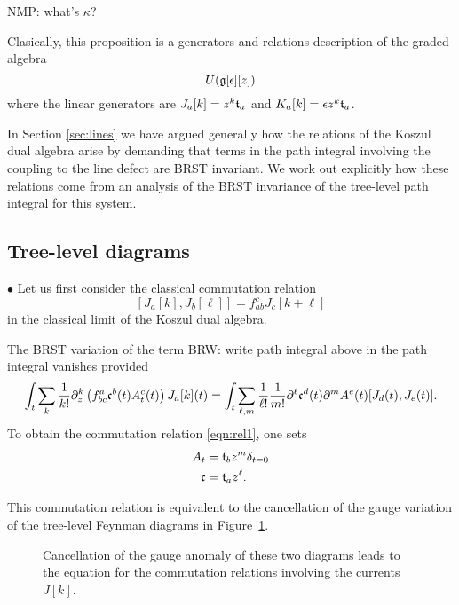\documentclass[11pt]{amsart}
\def\brian#1{{\textcolor{blue!65!red}{BRW: {#1}}}}
\def\natalie#1{{\textcolor{green!65!black}{NMP: {#1}}}}
\begin{document}
\natalie{what's $\kappa$?}

Clasically, this proposition is a generators and relations description of the graded algebra 
\[
U(\mathfrak g[\epsilon][z])
\]
where the linear generators are $J_a[k] = z^k \mathfrak t_a$ and $K_a [k] = \epsilon z^k \mathfrak t_a$. 


In Section \ref{sec:lines} we have argued generally how the relations of the Koszul dual algebra arise by demanding that terms in the path integral involving the coupling to the line defect are BRST invariant. 
We work out explicitly how these relations come from an analysis of the BRST invariance of the tree-level path integral for this system.

\subsection*{Tree-level diagrams}

$\bullet$
Let us first consider the classical commutation relation 
\begin{equation}\label{eqn:rel1}
[J_a [k] , J_b [\ell]] = f_{ab}^c J_{c} [k+\ell] 
\end{equation}
in the classical limit of the Koszul dual algebra. 

The BRST variation of the term \brian{write path integral above} in the path integral vanishes provided
\[
\int_t \sum_k \frac1{k!} \partial_z^k \left(f_{bc}^a \mathfrak c^b(t) A^c_t (t) \right) J_a[k] (t) = \int_t \sum_{\ell,m} \frac1{\ell!} \frac1{m!} \partial^\ell \mathfrak c^d (t) \partial^m A^e (t) [J_d (t), J_e(t)]  .
\] 
To obtain the commutation relation \eqref{eqn:rel1}, one sets 
\begin{align*}
A_t & = \mathfrak t_b z^{m} \delta_{t=0} \\
\mathfrak c & = \mathfrak t_a z^\ell .
\end{align*}

This commutation relation is equivalent to the cancellation of the gauge variation of the tree-level Feynman diagrams in Figure~\ref{fig:cancel1}.

\begin{figure}
	\caption{Cancellation of the gauge anomaly of these two diagrams leads to the equation for the commutation relations involving the currents $J[k]$.
	\label{fig:cancel1}}
\end{figure}
\end{document}
